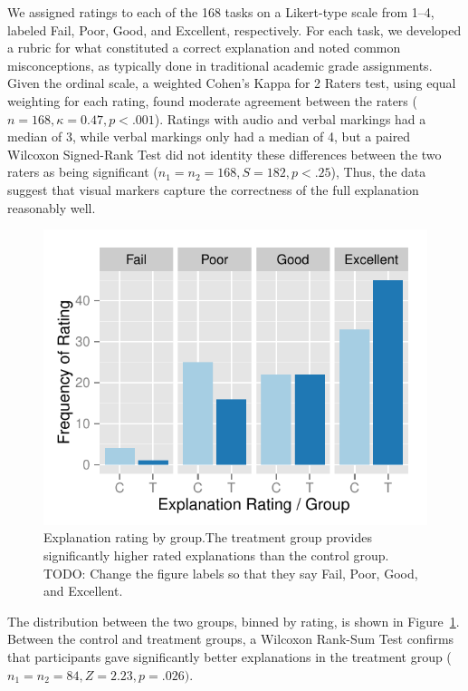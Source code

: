\documentclass[conference]{IEEEtran}
\begin{document}
We assigned ratings to each of the 168 tasks on a Likert-type scale from 1--4, labeled Fail, Poor, Good, and Excellent, respectively. For each task, we developed a rubric for what constituted a correct explanation and noted common misconceptions, as typically done in traditional academic grade assignments. Given the ordinal scale, a weighted Cohen's Kappa for 2 Raters test, using equal weighting for each rating, found moderate agreement between the raters ($n = 168, \kappa = 0.47, p < .001$). Ratings with audio and verbal markings had a median of 3, while verbal markings only had a median of 4, but a paired Wilcoxon Signed-Rank Test did not identity these differences between the two raters as being significant ($n_1 = n_2 = 168, S = 182, p < .25$), Thus, the data suggest that visual markers capture the correctness of the full explanation reasonably well. 

\begin{figure}[!t]
\centering
\includegraphics[width=\columnwidth]{ratingbygroup}
\caption{Explanation rating by group.The treatment group provides significantly higher rated explanations than the control group. TODO: Change the figure labels so that they say Fail, Poor, Good, and Excellent.\label{fig:ratingbygroup}}
\end{figure}

The distribution between the two groups, binned by rating, is shown in Figure~\ref{fig:ratingbygroup}. Between the control and treatment groups, a Wilcoxon Rank-Sum Test confirms that participants gave significantly better explanations in the treatment group ($n_1 = n_2 = 84, Z = 2.23, p = .026)$. 
\end{document}
